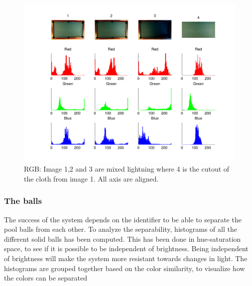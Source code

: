 \begin{figure}[H]
\begin{center}
\leavevmode
\includegraphics[width=1\textwidth]{images/rgb_hist_table}
\end{center}
\caption{RGB: Image 1,2 and 3 are mixed lightning where 4 is the cutout of the cloth from image 1. All axis are aligned.}
\label{fig:tablergb}
\end{figure}

\subsubsection{The balls}
The success of the system depends on the identifier to be able to separate the pool balls from each other. To analyze the separability, histograms of all the different solid balls has been computed. This has been done in hue-saturation space, to see if it is possible to be independent of brightness. Being independent of brightness will make the system more resistant towards changes in light. The histograms are grouped together based on the color similarity, to visualize how the colors can be separated

